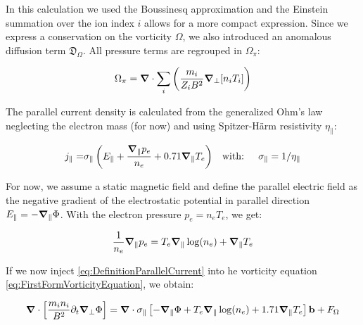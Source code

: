 In this calculation we used the Boussinesq approximation and the Einstein summation over the ion index $i$ allows for a more compact expression. Since we express a conservation on the vorticity $\Omega$, we also introduced an anomalous diffusion term $\mathfrak{D}_\Omega$. All pressure terms are regrouped in $\Omega_\pi$:

\begin{equation}
	\Omega_\pi = \grad\cdot\sum_{i}\left(\frac{m_i}{Z_i B^2}\grad_\perp[n_i T_i]\right)
\end{equation}


The parallel current density is calculated from the generalized Ohm's law neglecting the electron mass (for now) and using Spitzer-Härm resistivity $\eta_\parallel$:
 
\begin{align} 
 	\label{eq:DefinitionParallelCurrent}
 	j_\parallel =& \sigma_\parallel \left(E_\parallel + \frac{\grad_\parallel p_e}{n_e} + 0.71\grad_\parallel T_e\right) & \text{with: }&& \sigma_\parallel = 1/\eta_\parallel
 \end{align}

For now, we assume a static magnetic field and define the parallel electric field as the negative gradient of the electrostatic potential in parallel direction $E_\parallel=-\grad_\parallel\Phi$. With the electron pressure $p_e=n_eT_e$, we get:  
 
$$\frac{1}{n_e}\grad_\parallel p_e = T_e\grad_\parallel\log(n_e) + \grad_\parallel T_e$$

If we now inject \autoref{eq:DefinitionParallelCurrent} into he vorticity equation \autoref{eq:FirstFormVorticityEquation}, we obtain: 
 
\begin{equation}
	\label{eq:S3X_ElectrostaticVorticityEquation}
	 \grad\cdot\left[\frac{m_i n_i}{ B^2}\partial_t\grad_\perp\Phi\right]  = \grad\cdot\sigma_\parallel \left[-\grad_\parallel\Phi +  T_e\grad_\parallel\log(n_e) + 1.71\grad_\parallel T_e\right]\mathbf{b} + F_\Omega
\end{equation}


